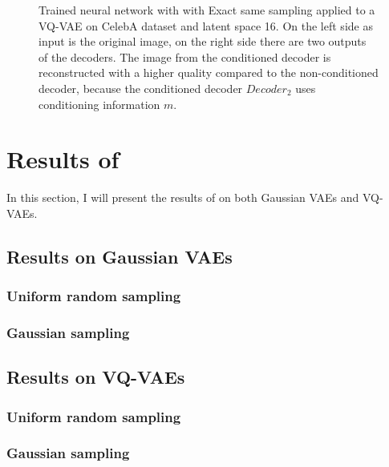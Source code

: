 \begin{figure}[H]
    \centering
    
    \caption[Trained neural network with  applied to a VQ-VAE.]
    { 
        Trained neural network with  with Exact same sampling applied to a VQ-VAE on CelebA dataset and latent space 16. 
        On the left side as input is the original image, on the right side there are two outputs of the decoders. 
        The image from the conditioned decoder is reconstructed with a higher quality compared to the non-conditioned decoder, because the conditioned decoder $Decoder_2$ uses conditioning information $m$.
    }
    \label{fig:res_val_vqvae}
\end{figure}


\section{Results of }

In this section, I will present the results of  on both Gaussian VAEs and VQ-VAEs.

\subsection{Results on Gaussian VAEs}

\subsubsection{Uniform random sampling}


\subsubsection{Gaussian sampling}

\subsection{Results on VQ-VAEs}

\subsubsection{Uniform random sampling}

\subsubsection{Gaussian sampling}


